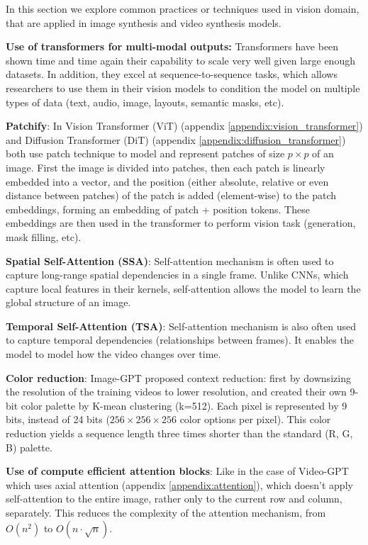 In this section we explore common practices or techniques used in vision domain, that are applied in image synthesis and video synthesis models.

\textbf{Use of transformers for multi-modal outputs:} Transformers have been shown time and time again their capability to scale very well given large enough datasets. In addition, they excel at sequence-to-sequence tasks, which allows researchers to use them in their vision models to condition the model on multiple types of data (text, audio, image, layouts, semantic masks, etc).

\textbf{Patchify}: In Vision Transformer (ViT) \cite{vision_transformer} (appendix \ref{appendix:vision_transformer}) and Diffusion Transformer (DiT) \cite{diffusion_transformer} (appendix \ref{appendix:diffusion_transformer}) both use patch technique to model and represent patches of size $p \times p$ of an image. First the image is divided into patches, then each patch is linearly embedded into a vector, and the position (either absolute, relative or even distance between patches) of the patch is added (element-wise) to the patch embeddings, forming an embedding of patch + position tokens. These embeddings are then used in the transformer to perform vision task (generation, mask filling, etc).

\textbf{Spatial Self-Attention (SSA)}: Self-attention mechanism is often used to capture long-range spatial dependencies in a single frame. Unlike CNNs, which capture local features in their kernels, self-attention allows the model to learn the global structure of an image.

\textbf{Temporal Self-Attention (TSA)}: Self-attention mechanism is also often used to capture temporal dependencies (relationships between frames). It enables the model to model how the video changes over time.

\textbf{Color reduction}: Image-GPT \cite{imagegpt} proposed context reduction: first by downsizing the resolution of the training videos to lower resolution, and created their own 9-bit color palette by K-mean clustering (k=512). Each pixel is represented by 9 bits, instead of 24 bits ($256\times 256\times 256$ color options per pixel). This color reduction yields a sequence length three times shorter than the standard (R, G, B) palette.

\textbf{Use of compute efficient attention blocks}: Like in the case of Video-GPT \cite{videogpt} which uses axial attention (appendix \ref{appendix:attention}), which doesn't apply self-attention to the entire image, rather only to the current row and column, separately. This reduces the complexity of the attention mechanism, from $O(n^2)$ to $O(n \cdot \sqrt{n})$.


